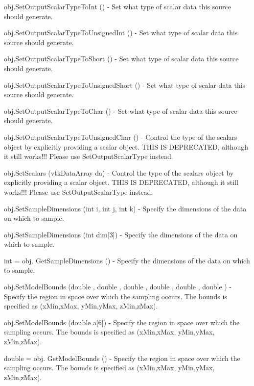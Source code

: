 \begin{DoxyItemize}
\item {\ttfamily obj.\-Set\-Output\-Scalar\-Type\-To\-Int ()} -\/ Set what type of scalar data this source should generate.  
\item {\ttfamily obj.\-Set\-Output\-Scalar\-Type\-To\-Unsigned\-Int ()} -\/ Set what type of scalar data this source should generate.  
\item {\ttfamily obj.\-Set\-Output\-Scalar\-Type\-To\-Short ()} -\/ Set what type of scalar data this source should generate.  
\item {\ttfamily obj.\-Set\-Output\-Scalar\-Type\-To\-Unsigned\-Short ()} -\/ Set what type of scalar data this source should generate.  
\item {\ttfamily obj.\-Set\-Output\-Scalar\-Type\-To\-Char ()} -\/ Set what type of scalar data this source should generate.  
\item {\ttfamily obj.\-Set\-Output\-Scalar\-Type\-To\-Unsigned\-Char ()} -\/ Control the type of the scalars object by explicitly providing a scalar object. T\-H\-I\-S I\-S D\-E\-P\-R\-E\-C\-A\-T\-E\-D, although it still works!!! Please use Set\-Output\-Scalar\-Type instead.  
\item {\ttfamily obj.\-Set\-Scalars (vtk\-Data\-Array da)} -\/ Control the type of the scalars object by explicitly providing a scalar object. T\-H\-I\-S I\-S D\-E\-P\-R\-E\-C\-A\-T\-E\-D, although it still works!!! Please use Set\-Output\-Scalar\-Type instead.  
\item {\ttfamily obj.\-Set\-Sample\-Dimensions (int i, int j, int k)} -\/ Specify the dimensions of the data on which to sample.  
\item {\ttfamily obj.\-Set\-Sample\-Dimensions (int dim\mbox{[}3\mbox{]})} -\/ Specify the dimensions of the data on which to sample.  
\item {\ttfamily int = obj. Get\-Sample\-Dimensions ()} -\/ Specify the dimensions of the data on which to sample.  
\item {\ttfamily obj.\-Set\-Model\-Bounds (double , double , double , double , double , double )} -\/ Specify the region in space over which the sampling occurs. The bounds is specified as (x\-Min,x\-Max, y\-Min,y\-Max, z\-Min,z\-Max).  
\item {\ttfamily obj.\-Set\-Model\-Bounds (double a\mbox{[}6\mbox{]})} -\/ Specify the region in space over which the sampling occurs. The bounds is specified as (x\-Min,x\-Max, y\-Min,y\-Max, z\-Min,z\-Max).  
\item {\ttfamily double = obj. Get\-Model\-Bounds ()} -\/ Specify the region in space over which the sampling occurs. The bounds is specified as (x\-Min,x\-Max, y\-Min,y\-Max, z\-Min,z\-Max).  

\end{DoxyItemize}

